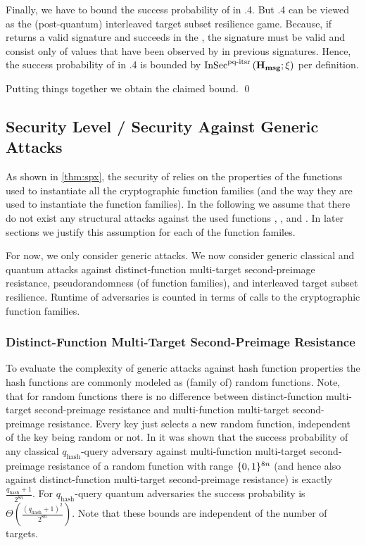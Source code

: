 Finally, we have to bound the success probability of \A in \game.4. But \game.4
can be viewed as the (post-quantum) interleaved target subset resilience game. 
Because, if \A returns a valid signature and succeeds in the \game, the \fors 
signature must be valid and consist only of values that have been observed by 
\A in previous signatures. Hence, the success probability of \A in \game.4 is 
bounded by ${\mathrm{InSec}}^{{\text{pq-itsr}}}\left( {\mathbf{H_{msg}}}; {\xi} \right) $ per definition.

Putting things together we obtain the claimed bound. \qed

\subsection{Security Level / Security Against Generic Attacks}
As shown in \autoref{thm:spx}, the security of \spx relies on the 
properties of the functions used to instantiate all the cryptographic function 
families (and the way they are used to instantiate the function families). 
In the following we assume that there do not exist any structural attacks 
against the used functions \shatwo, \shathree, and \haraka. In later sections
we justify this assumption for each of the function familes.

For now, we only consider generic attacks. We now consider generic 
classical and quantum attacks against
distinct-function multi-target second-preimage resistance, pseudorandomness (of 
function families), and interleaved target subset resilience. Runtime of 
adversaries is counted in terms of calls to the cryptographic function families.

\subsubsection{Distinct-Function Multi-Target Second-Preimage Resistance}
To evaluate the complexity of generic attacks against hash function properties
the hash functions are commonly modeled as (family of) random functions. Note, 
that for random functions there is no difference between distinct-function 
multi-target second-preimage resistance and multi-function multi-target 
second-preimage resistance. Every key just selects a new random function, 
independent of the key being random or not.
In \cite{Huelsing2016} it was shown that the success probability of any 
classical $q_{\text{hash}}$-query adversary against multi-function multi-target 
second-preimage resistance of a random function with range 
$\{0,1\}^{8n}$ (and hence also against distinct-function 
multi-target second-preimage resistance) is exactly $\frac{q_{\text{hash}}+1}{2^{8n}}$.
For $q_{\text{hash}}$-query quantum adversaries the success probability is 
$\Theta(\frac{(q_{\text{hash}}+1)^2}{2^{8n}})$. Note that these bounds are independent 
of the number of targets.

